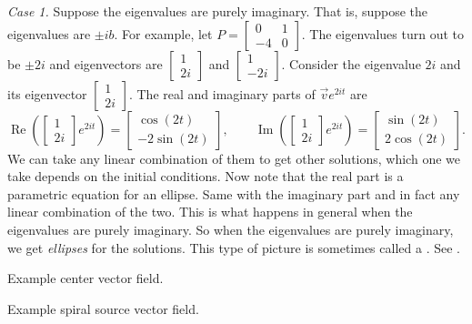 \emph{Case 1.} Suppose the eigenvalues are purely imaginary.
That is, suppose the eigenvalues are $\pm ib$.  For example,
let $P = 
\left[ \begin{smallmatrix} 0 & 1 \\ -4 & 0 \end{smallmatrix} \right]$.
The eigenvalues turn out to be $\pm 2i$ and eigenvectors are
$\left[ \begin{smallmatrix} 1 \\ 2i \end{smallmatrix} \right]$ and
$\left[ \begin{smallmatrix} 1 \\ -2i \end{smallmatrix} \right]$.  Consider
the eigenvalue $2i$ and its eigenvector
$\left[ \begin{smallmatrix} 1 \\ 2i \end{smallmatrix} \right]$.
The real and imaginary
parts of $\vec{v} e^{2it}$ are
\begin{equation*}
\operatorname{Re} \left(
\begin{bmatrix} 1 \\ 2i \end{bmatrix} e^{2it}\right) =
\begin{bmatrix} \cos (2t) \\ -2 \sin (2t)  \end{bmatrix} ,
\qquad
\operatorname{Im} \left(
\begin{bmatrix} 1 \\ 2i \end{bmatrix} e^{2it}\right) =
\begin{bmatrix} \sin (2t) \\ 2 \cos (2t) \end{bmatrix} .
\end{equation*}
We can take any linear combination of them to get other solutions,
which one we take
depends on the initial
conditions.  Now note that the real part is
a parametric equation for an ellipse.  Same with the imaginary part
and in fact any linear combination of the two.
This is what happens in general when the eigenvalues are purely imaginary.
So when the eigenvalues are purely imaginary, we get
\emph{ellipses} for the
solutions.  This type of picture is sometimes called a
\emph{}.  See .

\begin{myfig}
\parbox[t]{3.0in}{
 \capstart
 \caption{Example center vector field.\label{pln:ellipsesfig}}
}
\quad
\parbox[t]{3.0in}{
 \capstart
 \caption{Example spiral source vector field.\label{pln:spiral-sourcefig}}
}
\end{myfig}

